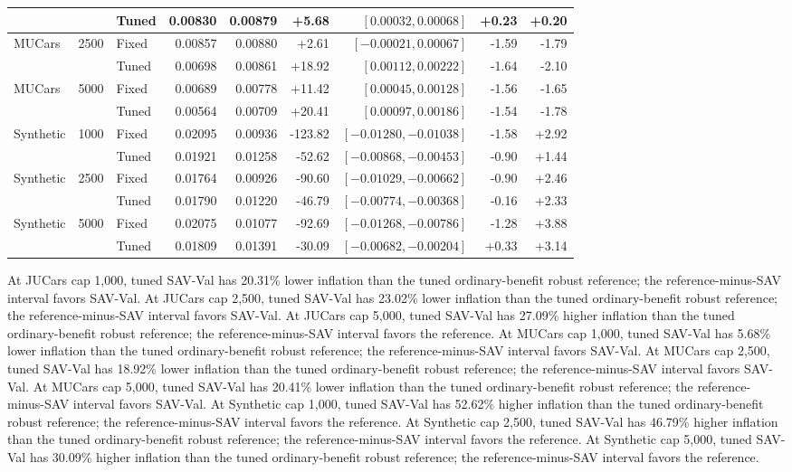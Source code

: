 \begin{table}[t]
\begin{tabular}{lrlrrrrrr}
 &  & Tuned & 0.00830 & 0.00879 & +5.68 & $[0.00032,0.00068]$ & +0.23 & +0.20\\
\midrule
MUCars & 2500 & Fixed & 0.00857 & 0.00880 & +2.61 & $[-0.00021,0.00067]$ & -1.59 & -1.79\\
 &  & Tuned & 0.00698 & 0.00861 & +18.92 & $[0.00112,0.00222]$ & -1.64 & -2.10\\
\midrule
MUCars & 5000 & Fixed & 0.00689 & 0.00778 & +11.42 & $[0.00045,0.00128]$ & -1.56 & -1.65\\
 &  & Tuned & 0.00564 & 0.00709 & +20.41 & $[0.00097,0.00186]$ & -1.54 & -1.78\\
\midrule
Synthetic & 1000 & Fixed & 0.02095 & 0.00936 & -123.82 & $[-0.01280,-0.01038]$ & -1.58 & +2.92\\
 &  & Tuned & 0.01921 & 0.01258 & -52.62 & $[-0.00868,-0.00453]$ & -0.90 & +1.44\\
\midrule
Synthetic & 2500 & Fixed & 0.01764 & 0.00926 & -90.60 & $[-0.01029,-0.00662]$ & -0.90 & +2.46\\
 &  & Tuned & 0.01790 & 0.01220 & -46.79 & $[-0.00774,-0.00368]$ & -0.16 & +2.33\\
\midrule
Synthetic & 5000 & Fixed & 0.02075 & 0.01077 & -92.69 & $[-0.01268,-0.00786]$ & -1.28 & +3.88\\
 &  & Tuned & 0.01809 & 0.01391 & -30.09 & $[-0.00682,-0.00204]$ & +0.33 & +3.14\\
\bottomrule
\end{tabular}
\end{table}

At JUCars cap 1,000, tuned SAV-Val has 20.31\% lower inflation than the tuned ordinary-benefit robust reference; the reference-minus-SAV interval favors SAV-Val.
At JUCars cap 2,500, tuned SAV-Val has 23.02\% lower inflation than the tuned ordinary-benefit robust reference; the reference-minus-SAV interval favors SAV-Val.
At JUCars cap 5,000, tuned SAV-Val has 27.09\% higher inflation than the tuned ordinary-benefit robust reference; the reference-minus-SAV interval favors the reference.
At MUCars cap 1,000, tuned SAV-Val has 5.68\% lower inflation than the tuned ordinary-benefit robust reference; the reference-minus-SAV interval favors SAV-Val.
At MUCars cap 2,500, tuned SAV-Val has 18.92\% lower inflation than the tuned ordinary-benefit robust reference; the reference-minus-SAV interval favors SAV-Val.
At MUCars cap 5,000, tuned SAV-Val has 20.41\% lower inflation than the tuned ordinary-benefit robust reference; the reference-minus-SAV interval favors SAV-Val.
At Synthetic cap 1,000, tuned SAV-Val has 52.62\% higher inflation than the tuned ordinary-benefit robust reference; the reference-minus-SAV interval favors the reference.
At Synthetic cap 2,500, tuned SAV-Val has 46.79\% higher inflation than the tuned ordinary-benefit robust reference; the reference-minus-SAV interval favors the reference.
At Synthetic cap 5,000, tuned SAV-Val has 30.09\% higher inflation than the tuned ordinary-benefit robust reference; the reference-minus-SAV interval favors the reference.

